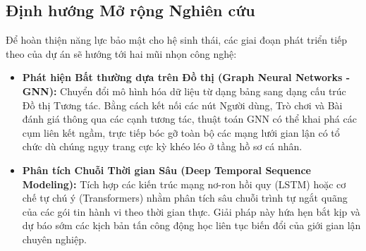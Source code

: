 \subsection{Định hướng Mở rộng Nghiên cứu}
Để hoàn thiện năng lực bảo mật cho hệ sinh thái, các giai đoạn phát triển tiếp theo của dự án sẽ hướng tới hai mũi nhọn công nghệ:
\begin{itemize}
    \item \textbf{Phát hiện Bất thường dựa trên Đồ thị (Graph Neural Networks - GNN):} Chuyển đổi mô hình hóa dữ liệu từ dạng bảng sang dạng cấu trúc Đồ thị Tương tác. Bằng cách kết nối các nút Người dùng, Trò chơi và Bài đánh giá thông qua các cạnh tương tác, thuật toán GNN có thể khai phá các cụm liên kết ngầm, trực tiếp bóc gỡ toàn bộ các mạng lưới gian lận có tổ chức dù chúng ngụy trang cực kỳ khéo léo ở tầng hồ sơ cá nhân.
    \item \textbf{Phân tích Chuỗi Thời gian Sâu (Deep Temporal Sequence Modeling):} Tích hợp các kiến trúc mạng nơ-ron hồi quy (LSTM) hoặc cơ chế tự chú ý (Transformers) nhằm phân tích sâu chuỗi trình tự ngắt quãng của các gói tin hành vi theo thời gian thực. Giải pháp này hứa hẹn bắt kịp và dự báo sớm các kịch bản tấn công động học liên tục biến đổi của giới gian lận chuyên nghiệp.
\end{itemize}